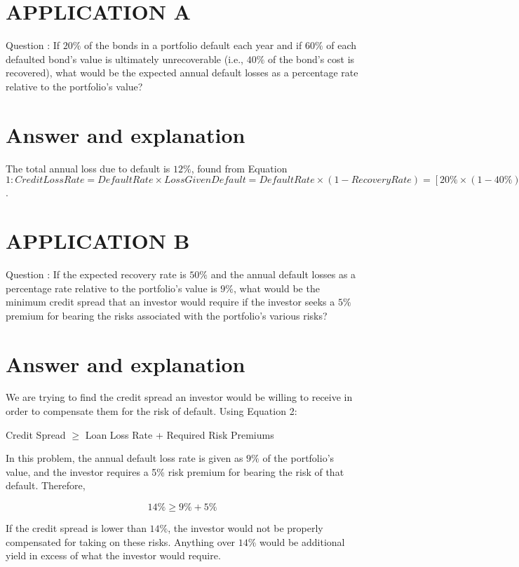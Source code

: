 \documentclass[11pt]{article}
\begin{document}
\section*{APPLICATION A}
Question : If $20 \%$ of the bonds in a portfolio default each year and if $60 \%$ of each defaulted bond's value is ultimately unrecoverable (i.e., $40 \%$ of the bond's cost is recovered), what would be the expected annual default losses as a percentage rate relative to the portfolio's value?

\section*{Answer and explanation}
The total annual loss due to default is $12 \%$, found from Equation $1: Credit Loss Rate = Default Rate× Loss Given Default
= Default Rate × (1 − Recovery Rate) =
[20 \% \times(1-40 \%)]=12 \%$.

\section*{APPLICATION B}
Question : If the expected recovery rate is $50 \%$ and the annual default losses as a percentage rate relative to the portfolio's value is $9 \%$, what would be the minimum credit spread that an investor would require if the investor seeks a $5 \%$ premium for bearing the risks associated with the portfolio's various risks?

\section*{Answer and explanation}
We are trying to find the credit spread an investor would be willing to receive in order to compensate them for the risk of default. Using Equation 2:

Credit Spread $\geq$ Loan Loss Rate + Required Risk Premiums

In this problem, the annual default loss rate is given as $9 \%$ of the portfolio's value, and the investor requires a 5\% risk premium for bearing the risk of that default. Therefore,

$$
14 \% \geq 9 \%+5 \%
$$

If the credit spread is lower than $14 \%$, the investor would not be properly compensated for taking on these risks. Anything over $14 \%$ would be additional yield in excess of what the investor would require.
\end{document}
